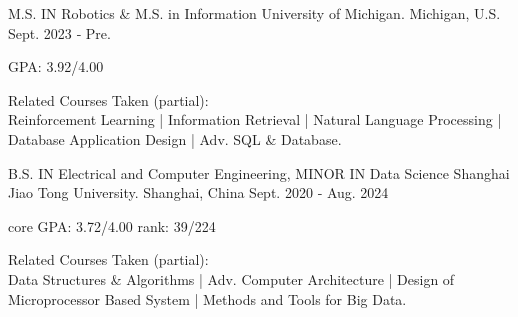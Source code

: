 

\begin{cventries}

\cventry
{M.S. IN Robotics \& M.S. in Information} %
{University of Michigan.} %
{Michigan, U.S.} %
{Sept. 2023 ‑ Pre.} %
{
  \begin{cvitems} %
    \item {GPA: 3.92/4.00}
    \item {Related Courses Taken (partial):} \\
    Reinforcement Learning | Information Retrieval | Natural Language Processing | Database Application Design | Adv. SQL \& Database. \\
  \end{cvitems}
}

\vspace{-0.5cm}
\cventry
{B.S. IN Electrical and Computer Engineering, MINOR IN Data Science} %
{Shanghai Jiao Tong University.} %
{Shanghai, China} %
{Sept. 2020 ‑ Aug. 2024} %
{
\begin{cvitems} %
  \item {core GPA: 3.72/4.00 \quad rank: 39/224}
  \item {Related Courses Taken (partial): }\\
  Data Structures \& Algorithms | Adv. Computer Architecture | Design of Microprocessor Based System | Methods and Tools for Big Data. 
\end{cvitems}
}

\end{cventries}


